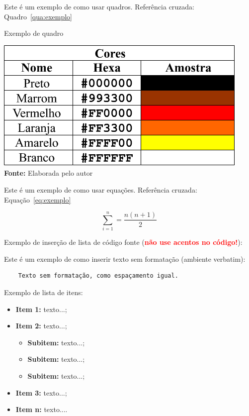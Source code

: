 \documentclass[
	article,			%
	11pt,				%
	oneside,			%
	a4paper,			%
	chapter=TITLE,		%
	section=TITLE,		%
	english,			%
	brazil,				%
	sumario=tradicional
]{abntex2}
\begin{document}
	
	Este é um exemplo de como usar quadros. Referência cruzada: Quadro~\ref{qua:exemplo}
	
	\FloatBarrier
	\begin{quadro}[!htbp]
		\centering
		\caption{Exemplo de quadro}
		\includegraphics[scale=.7]{imagens/exemploQuadro}
		\\\textbf{Fonte:} Elaborada pelo autor
		\label{qua:exemplo}
	\end{quadro}
	\FloatBarrier
	
	
	Este é um exemplo de como usar equações. Referência cruzada: Equação~\ref{eq:exemplo}
	
	\begin{equation}
	\sum_{i=1}^{n} = \frac{n(n+1)}{2}
	\label{eq:exemplo}
	\end{equation}
	
	
	Exemplo de inserção de lista de código fonte (\textbf{\textcolor{red}{não use acentos no código!}}):
	
	 
	
	
	
	Este é um exemplo de como inserir texto sem formatação (ambiente verbatim):
	
	\begin{verbatim}
	Texto sem formatação, como espaçamento igual.
	\end{verbatim}
	
	
	Exemplo de lista de itens:
	
	\begin{itemize}
		\item \textbf{Item 1:} texto...;
		\item \textbf{Item 2:} texto...;
        \begin{itemize}
                \item \textbf{Subitem:} texto...;
                \item \textbf{Subitem:} texto...;
                \item \textbf{Subitem:} texto...;
            \end{itemize}
		\item \textbf{Item 3:} texto...;
		\item \textbf{Item n:} texto....
	\end{itemize}
	
\end{document}
